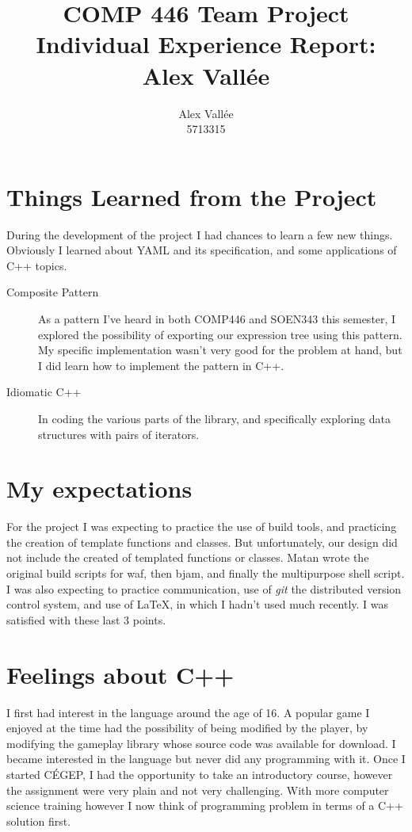 \documentclass{article}
\author{Alex Vall\'ee\\5713315}
\title{COMP 446 Team Project Individual Experience Report:\\Alex Vall\'ee}
\begin{document}
\maketitle
\doublespacing

\section{Things Learned from the Project}

During the development of the project I had chances to learn a few new things.
Obviously I learned about YAML and its specification, and some applications of
C++ topics.

\begin{description}
  \item[Composite Pattern] As a pattern I've heard in both COMP446 and SOEN343
    this semester, I explored the possibility of exporting our expression tree
    using this pattern.  My specific implementation wasn't very good for the
    problem at hand, but I did learn how to implement the pattern in C++.
  \item[Idiomatic C++] In coding the various parts of the library, and
    specifically exploring data structures with pairs of iterators.
\end{description}

\section{My expectations}
For the project I was expecting to practice the use of build tools, and
practicing the creation of template functions and classes. But unfortunately,
our design did not include the created of templated functions or classes.
Matan wrote the original build scripts for waf, then bjam, and finally the
multipurpose shell script.  I was also expecting to practice communication, use
of \emph{git} the distributed version control system, and use of \LaTeX, in
which I hadn't used much recently.  I was satisfied with these last 3 points.

\section{Feelings about C++}

I first had interest in the language around the age of 16.  A popular game I
enjoyed at the time had the possibility of being modified by the player, by
modifying the gameplay library whose source code was available for download.  I
became interested in the language but never did any programming with it. Once I
started C\'EGEP, I had the opportunity to take an introductory course, however
the assignment were very plain and not very challenging.  With more computer
science training however I now think of programming problem in terms of a C++
solution first.
\end{document}
